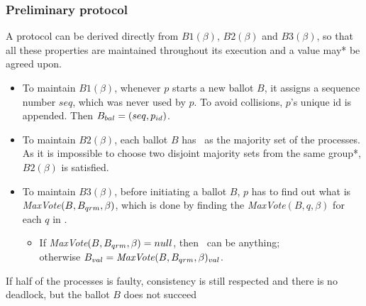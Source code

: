 \documentclass[10 pt]{beamer}
\begin{document}
\begin{frame}
\frametitle{Preliminary protocol}

A protocol can be derived directly from $B1(\beta)$, $B2(\beta)$ and $B3(\beta)$, so that all these properties are maintained throughout its execution and a value may* be agreed upon.

\begin{itemize}
  \item To maintain $B1(\beta)$, whenever $p$ starts a new ballot $B$, it assigns a sequence number $seq$, which was never used by $p$. To avoid collisions, $p$'s unique id is appended. Then $B_{bal} = (seq, p_{id})$.
  
  \pause
  \item To maintain $B2(\beta)$, each ballot $B$ has \bqrm\ as the majority set of the processes. As it is impossible to choose two disjoint majority sets from the same group*, $B2(\beta)$ is satisfied.
  
  \pause
  \item To maintain $B3(\beta)$, before initiating a ballot $B$, $p$ has to find out what is \textit{MaxVote}$(B, B_{qrm}, \beta)$, which is done by finding the \textit{MaxVote}$(B, q, \beta)$ for each $q$ in \bqrm.
  \begin{itemize}
    \item If \textit{MaxVote}$(B, B_{qrm}, \beta) = null$, then \bval\ can be anything;\\
    otherwise $B_{val} = \text{\textit{MaxVote}}(B, B_{qrm}, \beta)_{val}$.
  \end{itemize}
\end{itemize}

\pause
{\small * If half of the processes is faulty, consistency is still respected and there is no deadlock, but the ballot $B$ does not succeed}

\end{frame} 
\end{document}
